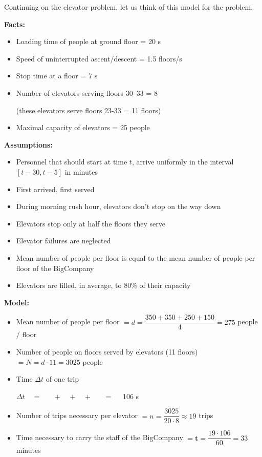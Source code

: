 \newpage

\question

Continuing on the elevator problem, let us think of this model for the problem.

\textbf{Facts:}
\begin{itemize}
	\item Loading time of people at ground floor = 20 s
	\item Speed of uninterrupted ascent/descent = 1.5 floors/s
	\item Stop time at a floor = 7 s
	\item Number of elevators serving floors 30--33 = 8

	(these elevators serve floors 23-33 = 11 floors)
	
	\item Maximal capacity of elevators = 25 people
\end{itemize}


\textbf{Assumptions:}
\begin{itemize}
	\item Personnel that should start at time $t$, arrive uniformly in the interval $[t-30, t-5]$ in minutes
	\item First arrived, first served
	\item During morning rush hour, elevators don't stop on the way down
	\item Elevators stop only at half the floors they serve
	\item Elevator failures are neglected
	\item Mean number of people per floor is equal to the mean number of people per floor of the BigCompany
	\item Elevators are filled, in average, to 80\% of their capacity
\end{itemize}


\textbf{Model:}
\begin{itemize}
	\item Mean number of people per floor $= d = \dfrac{350+350+250+150}{4} = 275$ people / floor
	\item Number of people on floors served by elevators (11 floors) $= N = d \cdot 11 = 3025$ people
	\item Time $\Delta t$ of one trip

\hfil $\Delta t \quad = \quad $  
		$ \;+ \;$ 
		$ \;+\; $ 
		$\;+\; $  $\quad = \quad$ 106 s
		
		\item Number of trips necessary per elevator $= n = \dfrac{3025}{20 \cdot 8} \approx 19$ trips

		\item Time necessary to carry the staff of the BigCompany $= \pmb{t} = \dfrac{19 \cdot 106}{60} = 33 $ minutes
\end{itemize}

